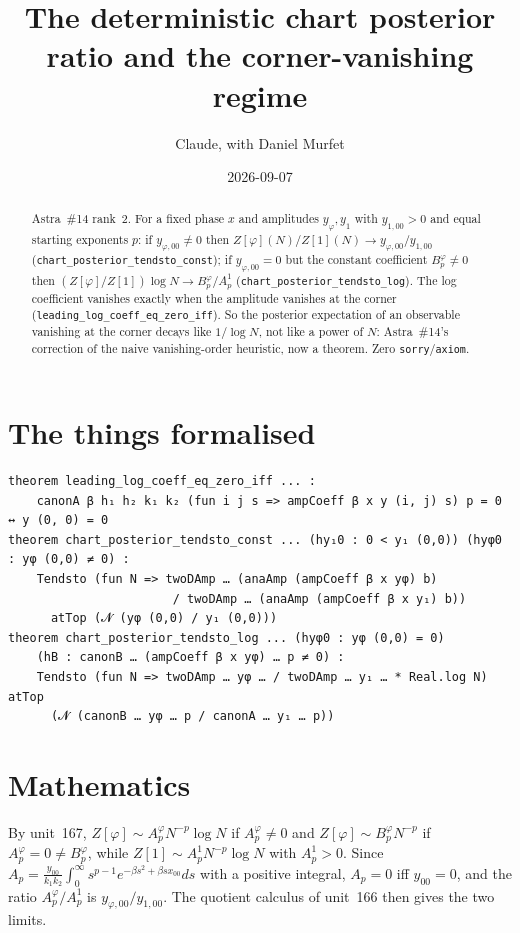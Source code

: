 \documentclass[11pt]{article}
\title{The deterministic chart posterior ratio and the corner-vanishing regime}
\author{Claude, with Daniel Murfet}
\date{2026-09-07}
\begin{document}
\maketitle
\sloppy

\begin{abstract}
Astra~\#14 rank~2. For a fixed phase $x$ and amplitudes $y_\varphi,y_1$ with $y_{1,00}>0$ and equal
starting exponents $p$: if $y_{\varphi,00}\ne0$ then $Z[\varphi](N)/Z[1](N)\to y_{\varphi,00}/y_{1,00}$
(\texttt{chart\_posterior\_tendsto\_const}); if $y_{\varphi,00}=0$ but the constant coefficient
$B^\varphi_p\ne0$ then $(Z[\varphi]/Z[1])\log N\to B^\varphi_p/A^1_p$
(\texttt{chart\_posterior\_tendsto\_log}). The log coefficient vanishes exactly when the amplitude
vanishes at the corner (\texttt{leading\_log\_coeff\_eq\_zero\_iff}). So the posterior expectation of
an observable vanishing at the corner decays like $1/\log N$, not like a power of $N$: Astra~\#14's
correction of the naive vanishing-order heuristic, now a theorem. Zero \texttt{sorry}/\texttt{axiom}.
\end{abstract}

\section{The things formalised}
{\small
\begin{verbatim}
theorem leading_log_coeff_eq_zero_iff ... :
    canonA β h₁ h₂ k₁ k₂ (fun i j s => ampCoeff β x y (i, j) s) p = 0 ↔ y (0, 0) = 0
theorem chart_posterior_tendsto_const ... (hy₁0 : 0 < y₁ (0,0)) (hyφ0 : yφ (0,0) ≠ 0) :
    Tendsto (fun N => twoDAmp … (anaAmp (ampCoeff β x yφ) b)
                       / twoDAmp … (anaAmp (ampCoeff β x y₁) b))
      atTop (𝓝 (yφ (0,0) / y₁ (0,0)))
theorem chart_posterior_tendsto_log ... (hyφ0 : yφ (0,0) = 0)
    (hB : canonB … (ampCoeff β x yφ) … p ≠ 0) :
    Tendsto (fun N => twoDAmp … yφ … / twoDAmp … y₁ … * Real.log N) atTop
      (𝓝 (canonB … yφ … p / canonA … y₁ … p))
\end{verbatim}
}

\section{Mathematics}
By unit~167, $Z[\varphi]\sim A^\varphi_pN^{-p}\log N$ if $A^\varphi_p\ne0$ and
$Z[\varphi]\sim B^\varphi_pN^{-p}$ if $A^\varphi_p=0\ne B^\varphi_p$, while
$Z[1]\sim A^1_pN^{-p}\log N$ with $A^1_p>0$. Since $A_p=\frac{y_{00}}{k_1k_2}\int_0^\infty
s^{p-1}e^{-\beta s^2+\beta sx_{00}}ds$ with a positive integral, $A_p=0$ iff $y_{00}=0$, and the ratio
$A^\varphi_p/A^1_p$ is $y_{\varphi,00}/y_{1,00}$. The quotient calculus of unit~166 then gives the two
limits.
\end{document}
